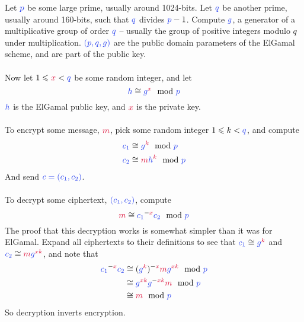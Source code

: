 	Let $\blue{p}$ be some large prime, usually around 1024-bits. Let $\blue{q}$ be another prime, usually around 160-bits, such that $\blue{q}$ divides $\blue{p}-1$. Compute $\blue{g}$, a generator of a multiplicative group of order $\blue{q}$ -- usually the group of positive integers modulo $q$ under multiplication. $\blue{(p,q,g)}$ are the public domain parameters of the ElGamal scheme, and are part of the public key.\\
\\
	Now let $1 \leqslant \red{x} < \blue{q}$ be some random integer, and let
	$$
		\blue{h} \cong \blue{g}^\red{x} \mod \blue{p}
	$$
	$\blue{h}$ is the ElGamal public key, and $\red{x}$ is the private key.\\
\\
	To encrypt some message, $\red{m}$, pick some random integer $1 \leqslant k < \blue{q}$, and compute
	\begin{align*}
		\blue{c_1} &\cong \blue{g}^\red{k} \mod \blue{p}\\
		\blue{c_2} &\cong \red{m}\blue{h}^\red{k} \mod \blue{p}
	\end{align*}
	And send $\blue{c = (c_1,c_2)}$.\\
\\
	To decrypt some ciphertext, $\blue{(c_1,c_2)}$, compute
	$$
		\red{m} \cong \blue{c_1}^{-\red{x}}\blue{c_2} \mod \blue{p}
	$$
	The proof that this decryption works is somewhat simpler than it was for ElGamal. Expand all ciphertexts to their definitions to see that $\blue{c_1} \cong \blue{g}^\red{k}$ and $\blue{c_2} \cong \red{m}\blue{g}^{\red{xk}}$, and note that
	\begin{align*}
		 \blue{c_1}^{-\red{x}}\blue{c_2}
	&\cong (\blue{g}^\red{k})^{-\red{x}}\red{m}\blue{g}^\red{xk} \mod \blue{p} \\
	&\cong \blue{g}^{\red{xk}}\blue{g}^{-\red{xk}}\red{m} \mod \blue{p} \\
	&\cong \red{m} \mod \blue{p}
	\end{align*}
	So decryption inverts encryption.\\\vspace{5mm}
\\
